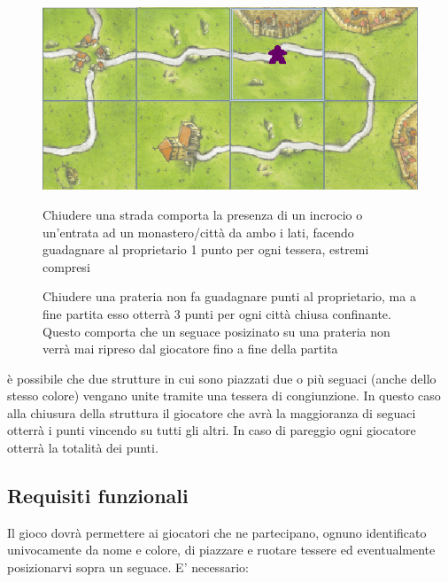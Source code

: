 \begin{figure}[hb]
    {\includegraphics[]{images/StradaMeeple.png}}

    \caption{Chiudere una strada comporta la presenza di un incrocio o un’entrata ad un monastero/città da ambo i lati, facendo guadagnare al proprietario 1 punto per ogni tessera, estremi compresi}
\end{figure}

\begin{figure}[hb]

    \caption{Chiudere una prateria non fa guadagnare punti al proprietario, ma a fine partita esso otterrà 3 punti per ogni città chiusa confinante. Questo comporta che un seguace posizinato su una prateria non verrà mai ripreso dal giocatore fino a fine della partita}
\end{figure}

è possibile che due strutture in cui sono piazzati due o più seguaci (anche dello stesso colore) vengano unite tramite una tessera di congiunzione. In questo caso alla chiusura della struttura il giocatore che avrà la maggioranza di seguaci otterrà i punti vincendo su tutti gli altri. In caso di pareggio ogni giocatore otterrà la totalità dei punti.

\subsection*{Requisiti funzionali}
Il gioco dovrà permettere ai giocatori che ne partecipano, ognuno identificato univocamente da nome e colore, di piazzare e ruotare tessere ed eventualmente posizionarvi sopra un seguace. E' necessario:

